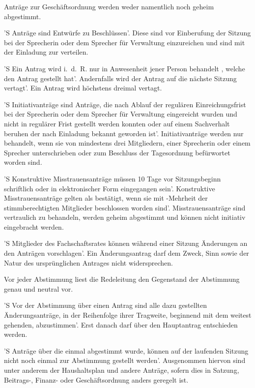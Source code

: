 \documentclass[%
	parskip=half,
]{scrartcl}
\newcommand{\edit}[1]{{\color{red} #1}}
\newcommand{\add}[1]{{\color{blue} #1}}
\begin{document}
\begin{contract}
Anträge zur Geschäftsordnung werden \edit{weder} namentlich \edit{noch} geheim abgestimmt.


'S Anträge sind Entwürfe zu Beschlüssen'. Diese sind vor Einberufung der Sitzung bei \edit{der Sprecherin oder dem 
Sprecher} für Verwaltung einzureichen und sind mit der Einladung zur verteilen.

'S Ein Antrag wird i.~d.~R. nur in Anwesenheit \edit{jener} Person behandelt\add{, welche den Antrag gestellt 
hat}'. Andernfalls wird der Antrag auf die nächste Sitzung vertagt'. Ein Antrag wird höchstens dreimal vertagt.

'S Initiativanträge sind Anträge, die nach Ablauf der regulären Einreichungsfrist bei \edit{der Sprecherin oder dem 
Sprecher} für Verwaltung eingereicht wurden und nicht in regulärer Frist gestellt werden konnten oder auf einem 
Sachverhalt beruhen der nach Einladung bekannt geworden ist'. Initiativanträge werden nur behandelt, wenn sie von 
mindestens drei Mitgliedern, \edit{einer Sprecherin oder einem Sprecher} unterschrieben oder zum Beschluss der 
Tagesordnung befürwortet worden sind.

'S Konstruktive Misstrauensanträge müssen 10 Tage vor Sitzungsbeginn schriftlich oder in elektronischer Form 
eingegangen sein'. Konstruktive Misstrauensanträge gelten als bestätigt, wenn sie mit -Mehrheit der 
stimmberechtigten Mitglieder beschlossen worden sind'. Misstrauensanträge sind vertraulich zu behandeln, werden geheim 
abgestimmt und können nicht initiativ eingebracht werden.

'S Mitglieder des Fachschaftsrates können während einer Sitzung Änderungen an den Anträgen vorschlagen'. Ein 
Änderungsantrag darf dem Zweck, Sinn sowie der Natur des ursprünglichen Antrages nicht widersprechen.


Vor jeder Abstimmung liest die \edit{Redeleitung} den Gegenstand der Abstimmung genau und neutral vor.

'S Vor der Abstimmung über einen Antrag sind alle dazu gestellten Änderungsanträge, in der Reihenfolge ihrer Tragweite, 
beginnend mit dem weitest gehenden, abzustimmen'. Erst danach darf über den Hauptantrag entschieden werden.

'S Anträge über die einmal abgestimmt wurde, können auf der laufenden Sitzung nicht noch einmal zur Abstimmung gestellt 
werden'. Ausgenommen hiervon sind unter anderem der Haushaltsplan und andere Anträge, sofern dies in Satzung, 
Beitrags-, Finanz- oder Geschäftsordnung anders geregelt ist.

\end{contract}
\end{document}
